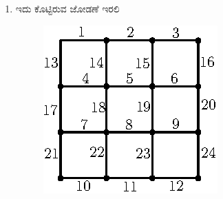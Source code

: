 \begin{enumerate}
\item ಇದು ಕೊಟ್ಟಿರುವ ಜೋಡಣೆ ಇರಲಿ 
\begin{figure}[H]
\centering
\includegraphics{images/chap8/ans13.eps}
\end{figure}


\end{enumerate}
